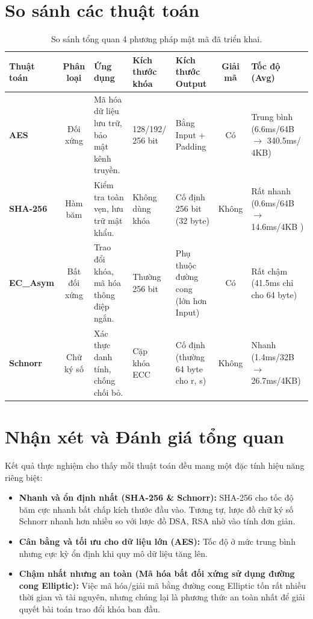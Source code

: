 \section{So sánh các thuật toán}

\begin{table}[H]
	\centering
	\small
	\setlength{\tabcolsep}{3pt} %
	\begin{tabularx}{\textwidth}{|l|c|X|X|X|c|X|} %
		\hline
		\textbf{Thuật toán} & \textbf{Phân loại} & \textbf{Ứng dụng} & \textbf{Kích thước khóa} & \textbf{Kích thước Output} & \textbf{Giải mã} & \textbf{Tốc độ (Avg)} \\
		\hline
		\textbf{AES} & Đối xứng & Mã hóa dữ liệu lưu trữ, bảo mật kênh truyền. & 128/192/ 256 bit & Bằng Input + Padding & Có & Trung bình (6.6ms/64B $\rightarrow$ 340.5ms/
		4KB) \\
		\hline
		\textbf{SHA-256} & Hàm băm & Kiểm tra toàn vẹn, lưu trữ mật khẩu. & Không dùng khóa & Cố định 256 bit (32 byte) & Không & Rất nhanh (0.6ms/64B $\rightarrow$ 14.6ms/4KB
		) \\
		\hline
		\textbf{EC\_Asym} & Bất đối xứng & Trao đổi khóa, mã hóa thông điệp ngắn. & Thường 256 bit & Phụ thuộc đường cong (lớn hơn Input) & Có & Rất chậm (41.5ms chỉ cho 64 byte) \\
		\hline
		\textbf{Schnorr} & Chữ ký số & Xác thực danh tính, chống chối bỏ. & Cặp khóa ECC & Cố định (thường 64 byte cho r, s) & Không & Nhanh (1.4ms/32B $\rightarrow$ 26.7ms/4KB) \\
		\hline
	\end{tabularx}
	\caption{So sánh tổng quan 4 phương pháp mật mã đã triển khai.}
	\label{tab:so-sanh-tong-quan}
\end{table}

\section{Nhận xét và Đánh giá tổng quan}

Kết quả thực nghiệm cho thấy mỗi thuật toán đều mang một đặc tính hiệu năng riêng biệt:

\begin{itemize}
	\item \textbf{Nhanh và ổn định nhất (SHA-256 \& Schnorr):} SHA-256 cho tốc độ băm cực nhanh bất chấp kích thước đầu vào. Tương tự, lược đồ chữ ký số Schnorr nhanh hơn nhiều so với lược đồ DSA, RSA nhờ vào tính đơn giản.
	\item \textbf{Cân bằng và tối ưu cho dữ liệu lớn (AES):} Tốc độ ở mức trung bình nhưng cực kỳ ổn định khi quy mô dữ liệu tăng lên.
	\item \textbf{Chậm nhất nhưng an toàn (Mã hóa bất đối xứng sử dụng đường cong Elliptic):} Việc mã hóa/giải mã bằng đường cong Elliptic tốn rất nhiều thời gian và tài nguyên, nhưng chúng lại là phương thức an toàn nhất để giải quyết bài toán trao đổi khóa ban đầu.
\end{itemize}

